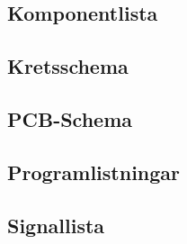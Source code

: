 \documentclass[a4paper,11pt]{article}
\begin{document}
	\subsection{Komponentlista}

	\subsection{Kretsschema}

	\subsection{PCB-Schema}

	\subsection{Programlistningar}

	\subsection{Signallista}
\end{document}

